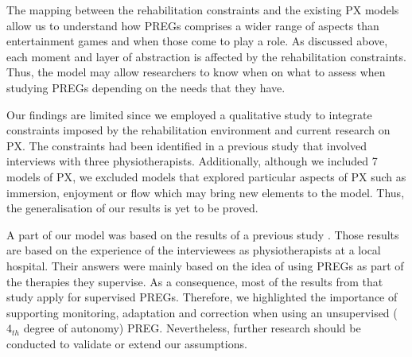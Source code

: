 The mapping between the rehabilitation constraints and the existing \ac{PX} models allow us to understand how \acp{PREG} comprises a wider range of aspects than entertainment games and when those come to play a role. As discussed above, each moment and layer of abstraction is affected by the rehabilitation constraints. Thus, the model may allow researchers to know when on what to assess when studying \acp{PREG} depending on the needs that they have.



Our findings are limited since we employed a qualitative study to integrate constraints imposed by the rehabilitation environment and current research on \ac{PX}. The constraints had been identified in a previous study that involved interviews with three physiotherapists. Additionally, although we included 7 models of \ac{PX}, we excluded models that explored particular aspects of \ac{PX} such as immersion, enjoyment or flow which may bring new elements to the model. Thus, the generalisation of our results is yet to be proved.

A part of our model was based on the results of a previous study . Those results are based on the experience of the interviewees as physiotherapists at a local hospital. Their answers were mainly based on the idea of using \acp{PREG} as part of the therapies they supervise. As a consequence, most of the results from that study apply for supervised \acp{PREG}. Therefore, we highlighted the importance of supporting monitoring, adaptation and correction when using an unsupervised ($4_{th}$ degree of autonomy) \ac{PREG}. Nevertheless, further research should be conducted to validate or extend our assumptions.

